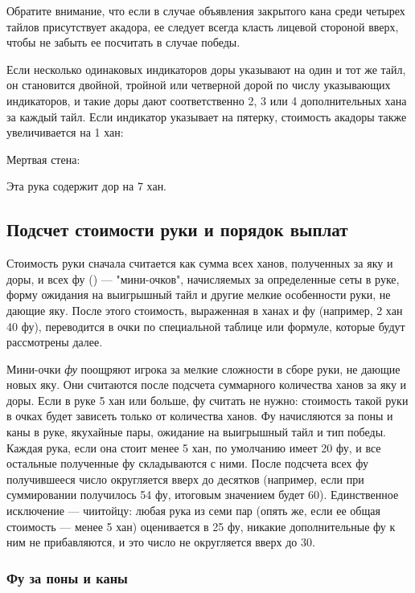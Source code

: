 Обратите внимание, что если в случае объявления закрытого кана среди четырех тайлов присутствует акадора, ее следует всегда класть лицевой стороной вверх, чтобы не забыть ее посчитать в случае победы.

Если несколько одинаковых индикаторов доры указывают на один и тот же тайл, он становится двойной, тройной или четверной дорой по числу указывающих индикаторов, и такие доры дают соответственно 2, 3 или 4 дополнительных хана за каждый тайл. Если индикатор указывает на пятерку, стоимость акадоры также увеличивается на 1 хан:


Мертвая стена:

Эта рука содержит дор на 7 хан.

\subsection{Подсчет стоимости руки и порядок выплат}

Стоимость руки сначала считается как сумма всех ханов, полученных за яку и доры, и всех фу () --- "мини-очков", начисляемых за определенные сеты в руке, форму ожидания на выигрышный тайл и другие мелкие особенности руки, не дающие яку. После этого стоимость, выраженная в ханах и фу (например, 2 хан 40 фу), переводится в очки по специальной таблице или формуле, которые будут рассмотрены далее.

Мини-очки \textit{фу} поощряют игрока за мелкие сложности в сборе руки, не дающие новых яку. Они считаются после подсчета суммарного количества ханов за яку и доры. Если в руке 5 хан или больше, фу считать не нужно: стоимость такой руки в очках будет зависеть только от количества ханов.
Фу начисляются за поны и каны в руке, якухайные пары, ожидание на выигрышный тайл и тип победы. Каждая рука, если она стоит менее 5 хан, по умолчанию имеет 20 фу, и все остальные полученные фу складываются с ними. После подсчета всех фу получившееся число округляется вверх до десятков (например, если при суммировании получилось 54 фу, итоговым значением будет 60). Единственное исключение --- чиитойцу: любая рука из семи пар (опять же, если ее общая стоимость --- менее 5 хан) оценивается в 25 фу, никакие дополнительные фу к ним не прибавляются, и это число не округляется вверх до 30.

\subsubsection{Фу за поны и каны}

